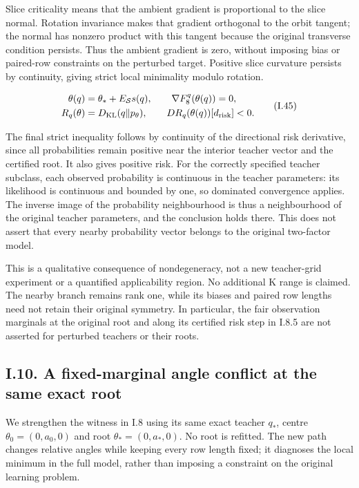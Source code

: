 \documentclass{article}
\begin{document}
Slice criticality means that the ambient gradient is proportional to the
slice normal. Rotation invariance makes that gradient orthogonal to the
orbit tangent; the normal has nonzero product with this tangent because
the original transverse condition persists. Thus the ambient gradient is
zero, without imposing bias or paired-row constraints on the perturbed
target. Positive slice curvature persists by continuity, giving strict
local minimality modulo rotation.

\[
\begin{aligned}
\theta(q)&=\theta_*+E_{\mathcal S}s(q),\qquad
\nabla F_8^q(\theta(q))=0,\\
R_q(\theta)&=D_{\rm KL}(q\Vert p_\theta),\qquad
D R_q(\theta(q))[d_{\mathrm{risk}}]<0.
\end{aligned}
\tag{I.45}
\]

The final strict inequality follows by continuity of the directional
risk derivative, since all probabilities remain positive near the
interior teacher vector and the certified root. It also gives positive
risk. For the correctly specified teacher subclass, each observed
probability is continuous in the teacher parameters: its likelihood is
continuous and bounded by one, so dominated convergence applies. The
inverse image of the probability neighbourhood is thus a neighbourhood
of the original teacher parameters, and the conclusion holds there. This
does not assert that every nearby probability vector belongs to the
original two-factor model.

This is a qualitative consequence of nondegeneracy, not a new
teacher-grid experiment or a quantified applicability region. No
additional K range is claimed. The nearby branch remains rank one, while
its biases and paired row lengths need not retain their original
symmetry. In particular, the fair observation marginals at the original
root and along its certified risk step in I.8.5 are not asserted for
perturbed teachers or their roots.

\subsection*{I.10. A fixed-marginal angle conflict at the same exact
root}\label{same-root-angle}

We strengthen the witness in I.8 using its same exact teacher \(q_*\),
centre \(\theta_0=(0,a_0,0)\) and root \(\theta_*=(0,a_*,0)\). No root
is refitted. The new path changes relative angles while keeping every
row length fixed; it diagnoses the local minimum in the full model,
rather than imposing a constraint on the original learning problem.
\end{document}
